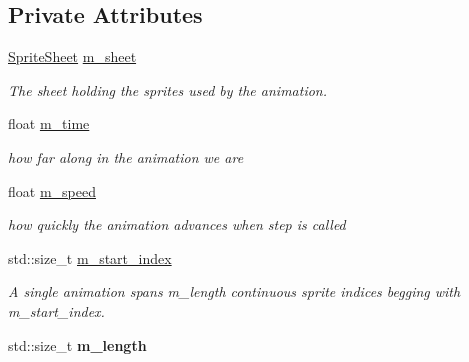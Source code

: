 \subsection*{Private Attributes}
\begin{DoxyCompactItemize}
\item 
\mbox{\label{classnta_1_1Animation2D_a7299c55bbae2e3a8eed7bbfde8362523}} 
\hyperlink{structnta_1_1SpriteSheet}{Sprite\+Sheet} \hyperlink{classnta_1_1Animation2D_a7299c55bbae2e3a8eed7bbfde8362523}{m\+\_\+sheet}
\begin{DoxyCompactList}\small\item\em The sheet holding the sprites used by the animation. \end{DoxyCompactList}\item 
\mbox{\label{classnta_1_1Animation2D_a24497412429334fe270a1b0ba6526203}} 
float \hyperlink{classnta_1_1Animation2D_a24497412429334fe270a1b0ba6526203}{m\+\_\+time}
\begin{DoxyCompactList}\small\item\em how far along in the animation we are \end{DoxyCompactList}\item 
\mbox{\label{classnta_1_1Animation2D_ae2df81906b0e98c7df18ed19950695e7}} 
float \hyperlink{classnta_1_1Animation2D_ae2df81906b0e98c7df18ed19950695e7}{m\+\_\+speed}
\begin{DoxyCompactList}\small\item\em how quickly the animation advances when step is called \end{DoxyCompactList}\item 
\mbox{\label{classnta_1_1Animation2D_a61cdaf3599067dc1e2fe3b926b29b838}} 
std\+::size\+\_\+t \hyperlink{classnta_1_1Animation2D_a61cdaf3599067dc1e2fe3b926b29b838}{m\+\_\+start\+\_\+index}
\begin{DoxyCompactList}\small\item\em A single animation spans m\+\_\+length continuous sprite indices begging with m\+\_\+start\+\_\+index. \end{DoxyCompactList}\item 
\mbox{\label{classnta_1_1Animation2D_a7ad254603c0e4c081895989643f6aa9e}} 
std\+::size\+\_\+t {\bfseries m\+\_\+length}
\end{DoxyCompactItemize}


